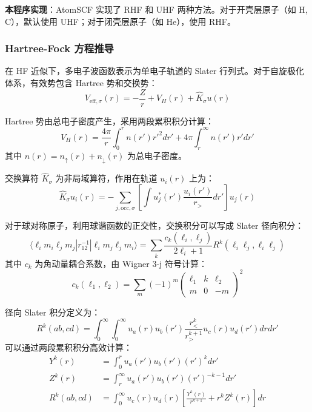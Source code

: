 \documentclass[12pt,a4paper]{article}
\begin{document}
\textbf{本程序实现}：AtomSCF 实现了 RHF 和 UHF 两种方法。对于开壳层原子（如 H, C），默认使用 UHF；对于闭壳层原子（如 He），使用 RHF。

\subsubsection{Hartree-Fock 方程推导}

在 HF 近似下，多电子波函数表示为单电子轨道的 Slater 行列式。对于自旋极化体系，有效势包含 Hartree 势和交换势：
\begin{equation}
    V_{\text{eff},\sigma}(r) = -\frac{Z}{r} + V_H(r) + \hat{K}_\sigma u(r)
\end{equation}

Hartree 势由总电子密度产生，采用两段累积积分计算：
\begin{equation}
    V_H(r) = \frac{4\pi}{r}\int_0^r n(r')r'^2 dr' + 4\pi\int_r^{\infty} n(r')r' dr'
\end{equation}
其中 $n(r) = n_\uparrow(r) + n_\downarrow(r)$ 为总电子密度。

交换算符 $\hat{K}_\sigma$ 为非局域算符，作用在轨道 $u_i(r)$ 上为：
\begin{equation}
    \hat{K}_\sigma u_i(r) = -\sum_{j, \text{occ}, \sigma} \left[ \int u_j^*(r') \frac{u_i(r')}{r_>} dr' \right] u_j(r)
\end{equation}

对于球对称原子，利用球谐函数的正交性，交换积分可以写成 Slater 径向积分：
\begin{equation}
    \langle \ell_i m_i \ell_j m_j | r_{12}^{-1} | \ell_i m_j \ell_j m_i \rangle = \sum_k \frac{c_k(\ell_i, \ell_j)}{2\ell_i + 1} R^k(\ell_i \ell_j, \ell_i \ell_j)
\end{equation}
其中 $c_k$ 为角动量耦合系数，由 Wigner 3-j 符号计算：
\begin{equation}
    c_k(\ell_1, \ell_2) = \sum_m (-1)^{m} \begin{pmatrix} \ell_1 & k & \ell_2 \\ m & 0 & -m \end{pmatrix}^2
\end{equation}

径向 Slater 积分定义为：
\begin{equation}
    R^k(ab, cd) = \int_0^\infty \int_0^\infty u_a(r) u_b(r') \frac{r_<^k}{r_>^{k+1}} u_c(r) u_d(r') dr dr'
\end{equation}
可以通过两段累积积分高效计算：
\begin{align}
    Y^k(r)      & = \int_0^r u_a(r') u_b(r') (r')^k dr'                                               \\
    Z^k(r)      & = \int_r^\infty u_a(r') u_b(r') (r')^{-k-1} dr'                                     \\
    R^k(ab, cd) & = \int_0^\infty u_c(r) u_d(r) \left[ \frac{Y^k(r)}{r^{k+1}} + r^k Z^k(r) \right] dr
\end{align}
\end{document}
